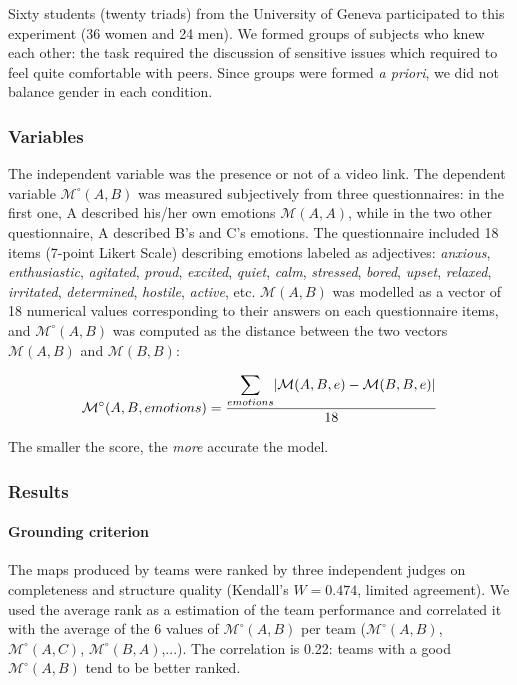 \documentclass[natbib]{svjour3}
\newcommand{\A}{A\xspace}
\newcommand{\B}{B\xspace}
\newcommand{\C}{C\xspace}
\newcommand{\M}[3]{{\mathcal{M}(#1, #2, #3)}}
\newcommand{\gmodel}[2]{{$\mathcal{M}(#1, #2)$}}
\newcommand{\gModel}[2]{{$\mathcal{M}^{\circ}(#1, #2)$}}
\newcommand{\Mdeg}[3]{{\mathcal{M}^{\circ}(#1, #2, #3)}}
\DeclarePairedDelimiter\abs{\lvert}{\rvert}%
\begin{document}
Sixty students (twenty triads) from the University of Geneva participated to
this experiment (36 women and 24 men). We formed groups of subjects who knew
each other: the task required the discussion of sensitive issues which required
to feel quite comfortable with peers. Since groups were formed \textit{a
priori}, we did not balance gender in each condition.

\subsubsection*{Variables}

The independent variable was the presence or not of a video link. The dependent
variable \gModel{A}{B} was measured subjectively from three questionnaires: in
the first one, \A described his/her own emotions \gmodel{A}{A}, while in the
two other questionnaire, \A described \B's and \C's emotions. The questionnaire
included 18 items (7-point Likert Scale) describing emotions labeled as
adjectives: \emph{anxious}, \emph{enthusiastic}, \emph{agitated}, \emph{proud},
\emph{excited}, \emph{quiet}, \emph{calm}, \emph{stressed}, \emph{bored},
\emph{upset}, \emph{relaxed}, \emph{irritated}, \emph{determined},
\emph{hostile}, \emph{active}, etc. \gmodel{A}{B} was modelled as a vector of 18
numerical values corresponding to their answers on each questionnaire items, and
\gModel{A}{B} was computed as the distance between the two vectors
\gmodel{A}{B} and \gmodel{B}{B}:

\[
    \Mdeg{A}{B}{emotions} = \frac{\displaystyle\sum_{emotions} \abs{\M{A}{B}{e} -
    \M{B}{B}{e}}}{18}
\]

The smaller the score, the \emph{more} accurate the model.

\subsubsection*{Results}

\paragraph{Grounding criterion} The maps produced by teams were ranked by three
independent judges on completeness and structure quality (Kendall's $W=0.474$,
limited agreement). We used the average rank as a estimation of the team
performance and correlated it with the average of the 6 values of \gModel{A}{B}
per team (\gModel{A}{B}, \gModel{A}{C}, \gModel{B}{A},...). The correlation is
0.22: teams with a good \gModel{A}{B} tend to be better ranked. 
\end{document}
